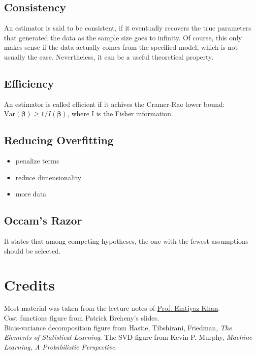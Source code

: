 \documentclass[10pt,a4paper,landscape]{article}
\newcommand{\Var}{\mathrm{Var}}
\newcommand{\bbeta}{\boldsymbol\beta}
\begin{document}
\begin{multicols*}{4}
\subsection{Consistency}
An estimator is said to be consistent, if it eventually recovers the true parameters that generated the data as the sample size goes to infinity. Of course, this only makes sense if the data actually comes from the specified model, which is not usually the case. Nevertheless, it can be a useful theoretical property.

\subsection{Efficiency}
An estimator is called efficient if it achives the Cramer-Rao lower bound:
$\Var{(\bbeta)} \geq 1/I(\bbeta)$, where I is the Fisher information.

\subsection{Reducing Overfitting}
\begin{itemize}[itemsep=0pt]
\item penalize terms
\item reduce dimensionality
\item more data
\end{itemize}

\subsection{Occam's Razor}
It states that among competing hypotheses, the one with the fewest assumptions should be selected. %




\section{Credits}
Most material was taken from the lecture notes of \href{http://people.epfl.ch/228491}{Prof. Emtiyaz Khan}.\\
Cost functions figure from Patrick Breheny's slides.\\
Biais-variance decomposition figure from Hastie, Tibshirani, Friedman, \textit{The Elements of Statistical Learning}.
The SVD figure from Kevin P. Murphy, \textit{Machine Learning, A Probabilistic Perspective}.


\end{multicols*}
\end{document}
